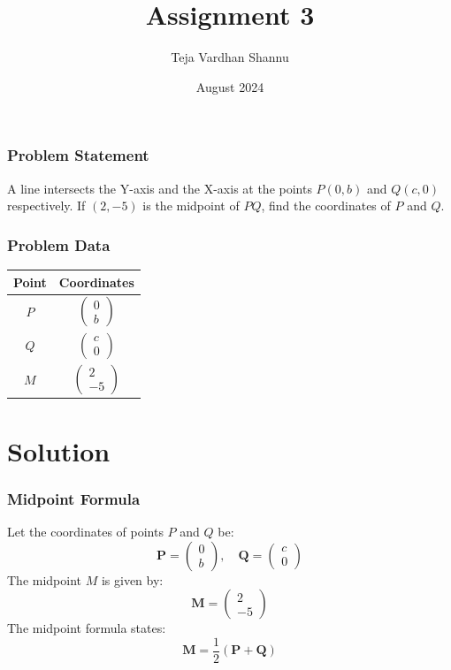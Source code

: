 \documentclass{beamer}
\title{Assignment 3}
\author{Teja Vardhan Shannu}
\date{August 2024}
\providecommand{\brak}[1]{\ensuremath{\left(#1\right)}}
\theoremstyle{remark}
\begin{document}
\begin{frame}
\titlepage
\end{frame}

\begin{frame}
\frametitle{Problem Statement}
A line intersects the Y-axis and the X-axis at the points $ P\brak{0, b} $ and $ Q\brak{c, 0} $ respectively. If $ \brak{2, -5} $ is the midpoint of $ PQ $, find the coordinates of $ P $ and $ Q $.
\end{frame}

\begin{frame}
\frametitle{Problem Data}
\begin{table}[h]
\centering
\begin{tabular}{|c|c|}
\hline
\textbf{Point} & \textbf{Coordinates} \\ \hline
$ P $ & $ \begin{pmatrix} 0 \\ b \end{pmatrix} $ \\ \hline
$ Q $ & $ \begin{pmatrix} c \\ 0 \end{pmatrix} $ \\ \hline
$ M $ & $ \begin{pmatrix} 2 \\ -5 \end{pmatrix} $ \\ \hline
\end{tabular}
\end{table}
\end{frame}

\section{Solution}
\begin{frame}
\frametitle{Midpoint Formula}
Let the coordinates of points $ P $ and $ Q $ be:
\begin{equation*}
\mathbf{P} = \begin{pmatrix} 0 \\ b \end{pmatrix}, \quad \mathbf{Q} = \begin{pmatrix} c \\ 0 \end{pmatrix}
\end{equation*}
The midpoint $ M $ is given by:
\begin{equation*}
\mathbf{M} = \begin{pmatrix} 2 \\ -5 \end{pmatrix}
\end{equation*}
The midpoint formula states:
\begin{equation*}
\mathbf{M} = \frac{1}{2} \brak{\mathbf{P} + \mathbf{Q}}
\end{equation*}
\end{frame}
\end{document}
